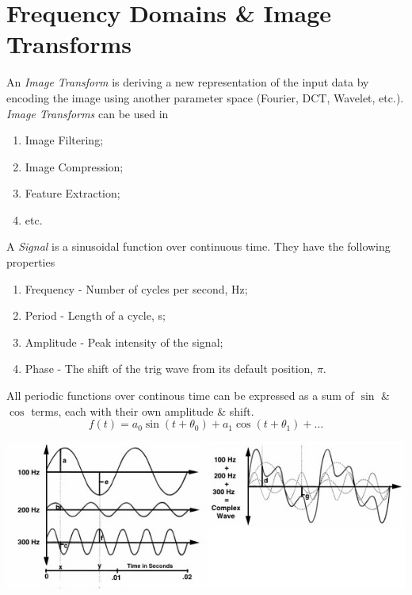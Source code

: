 \documentclass[11pt,a4paper]{article}
\begin{document}
\section{Frequency Domains \& Image Transforms}

An \textit{Image Transform} is deriving a new representation of the input data by encoding the image using another parameter space (\eg Fourier, DCT, Wavelet, etc.).\\

\textit{Image Transforms} can be used in
\begin{enumerate}[label=\roman*)]
	\item Image Filtering;
	\item Image Compression;
	\item Feature Extraction;
	\item etc.
\end{enumerate}

A \textit{Signal} is a sinusoidal function over continuous time. They have the following properties
\begin{enumerate}[label=\roman*)]
	\item Frequency - Number of cycles per second, Hz;
	\item Period - Length of a cycle, s;
	\item Amplitude - Peak intensity of the signal;
	\item Phase - The shift of the trig wave from its default position, $\pi$.
\end{enumerate}

All periodic functions over continous time can be expressed as a sum of $\sin$ \&$ \cos$ terms, each with their own amplitude \& shift.\\
$$f(t)=a_0\sin(t+\theta_0)+a_1\cos(t+\theta_1)+\dots$$

\includegraphics[scale=2]{img/fourier_transform.jpg}
\end{document}
